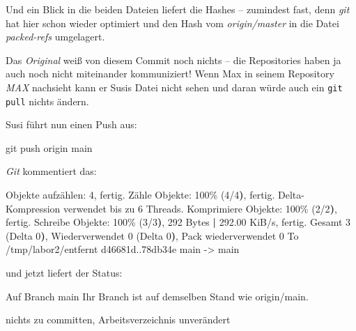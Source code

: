 \documentclass[
  letterpaper,
  DIV=11]{scrreprt}
\newenvironment{Shaded}{\begin{snugshade}}{\end{snugshade}}
\newcommand{\AttributeTok}[1]{\textcolor[rgb]{0.40,0.45,0.13}{#1}}
\newcommand{\ErrorTok}[1]{\textcolor[rgb]{0.68,0.00,0.00}{#1}}
\newcommand{\ExtensionTok}[1]{\textcolor[rgb]{0.00,0.23,0.31}{#1}}
\newcommand{\FunctionTok}[1]{\textcolor[rgb]{0.28,0.35,0.67}{#1}}
\newcommand{\KeywordTok}[1]{\textcolor[rgb]{0.00,0.23,0.31}{\textbf{#1}}}
\newcommand{\NormalTok}[1]{\textcolor[rgb]{0.00,0.23,0.31}{#1}}
\newcommand{\OperatorTok}[1]{\textcolor[rgb]{0.37,0.37,0.37}{#1}}
\newcommand{\StringTok}[1]{\textcolor[rgb]{0.13,0.47,0.30}{#1}}
\newcommand{\cmd}[1]{\texttt{#1}\xspace}
\newcommand{\git}{\textit{git}\xspace}
\begin{document}
Und ein Blick in die beiden Dateien liefert die Hashes -- zumindest
fast, denn \git hat hier schon wieder optimiert und den Hash vom
\emph{origin/master} in die Datei \emph{packed-refs} umgelagert.

Das \emph{Original} weiß von diesem Commit noch nichts -- die
Repositories haben ja auch noch nicht miteinander kommuniziert! Wenn Max
in seinem Repository \emph{MAX} nachsieht kann er Susis Datei nicht
sehen und daran würde auch ein \cmd{git pull} nichts ändern.

Susi führt nun einen Push aus:

\begin{Shaded}
\begin{Highlighting}[]
\FunctionTok{git}\NormalTok{ push origin main }
\end{Highlighting}
\end{Shaded}

\emph{Git} kommentiert das:

\begin{Shaded}
\begin{Highlighting}[]
\ExtensionTok{Objekte}\NormalTok{ aufzählen: 4, fertig.}
\ExtensionTok{Zähle}\NormalTok{ Objekte: 100\% }\ErrorTok{(}\ExtensionTok{4/4}\KeywordTok{)}\ExtensionTok{,}\NormalTok{ fertig.}
\ExtensionTok{Delta{-}Kompression}\NormalTok{ verwendet bis zu 6 Threads.}
\ExtensionTok{Komprimiere}\NormalTok{ Objekte: 100\% }\ErrorTok{(}\ExtensionTok{2/2}\KeywordTok{)}\ExtensionTok{,}\NormalTok{ fertig.}
\ExtensionTok{Schreibe}\NormalTok{ Objekte: 100\% }\ErrorTok{(}\ExtensionTok{3/3}\KeywordTok{)}\ExtensionTok{,}\NormalTok{ 292 Bytes }\KeywordTok{|} \ExtensionTok{292.00}\NormalTok{ KiB/s, fertig.}
\ExtensionTok{Gesamt}\NormalTok{ 3 }\ErrorTok{(}\ExtensionTok{Delta}\NormalTok{ 0}\KeywordTok{)}\ExtensionTok{,}\NormalTok{ Wiederverwendet 0 }\ErrorTok{(}\ExtensionTok{Delta}\NormalTok{ 0}\KeywordTok{)}\ExtensionTok{,}\NormalTok{ Pack wiederverwendet 0}
\ExtensionTok{To}\NormalTok{ /tmp/labor2/entfernt}
   \ExtensionTok{d46681d..78db34e}\NormalTok{  main }\AttributeTok{{-}}\OperatorTok{\textgreater{}}\NormalTok{ main}
\end{Highlighting}
\end{Shaded}

und jetzt liefert der Status:

\begin{Shaded}
\begin{Highlighting}[]
\ExtensionTok{Auf}\NormalTok{ Branch main}
\ExtensionTok{Ihr}\NormalTok{ Branch ist auf demselben Stand wie }\StringTok{\textquotesingle{}origin/main\textquotesingle{}}\NormalTok{.}

\ExtensionTok{nichts}\NormalTok{ zu committen, Arbeitsverzeichnis unverändert}
\end{Highlighting}
\end{Shaded}
\end{document}

